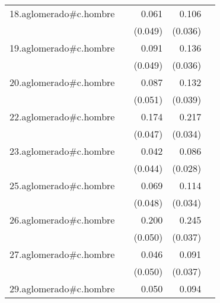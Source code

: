 {\begin{longtable}{l*{4}{D{.}{.}{-1}}}
\addlinespace
18.aglomerado#c.hombre&                     &       0.061         &       0.106\sym{**} &                     \\
            &                     &     (0.049)         &     (0.036)         &                     \\
\addlinespace
19.aglomerado#c.hombre&                     &       0.091         &       0.136\sym{***}&                     \\
            &                     &     (0.049)         &     (0.036)         &                     \\
\addlinespace
20.aglomerado#c.hombre&                     &       0.087         &       0.132\sym{***}&                     \\
            &                     &     (0.051)         &     (0.039)         &                     \\
\addlinespace
22.aglomerado#c.hombre&                     &       0.174\sym{***}&       0.217\sym{***}&                     \\
            &                     &     (0.047)         &     (0.034)         &                     \\
\addlinespace
23.aglomerado#c.hombre&                     &       0.042         &       0.086\sym{**} &                     \\
            &                     &     (0.044)         &     (0.028)         &                     \\
\addlinespace
25.aglomerado#c.hombre&                     &       0.069         &       0.114\sym{***}&                     \\
            &                     &     (0.048)         &     (0.034)         &                     \\
\addlinespace
26.aglomerado#c.hombre&                     &       0.200\sym{***}&       0.245\sym{***}&                     \\
            &                     &     (0.050)         &     (0.037)         &                     \\
\addlinespace
27.aglomerado#c.hombre&                     &       0.046         &       0.091\sym{*}  &                     \\
            &                     &     (0.050)         &     (0.037)         &                     \\
\addlinespace
29.aglomerado#c.hombre&                     &       0.050         &       0.094\sym{**} &                     \\

\end{longtable}}
